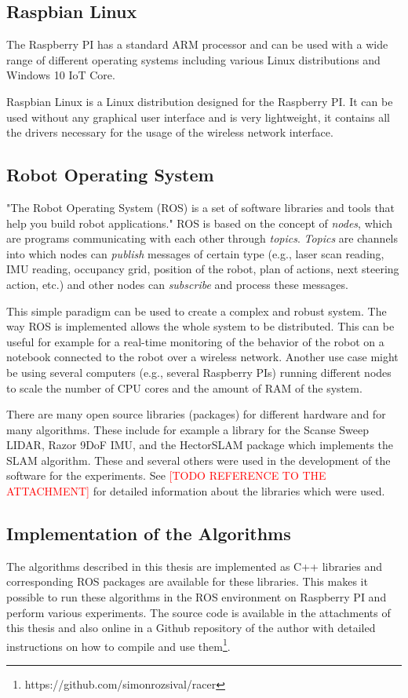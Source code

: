 \subsection{Raspbian Linux}

The Raspberry PI has a standard ARM processor and can be used with a wide range of different operating systems including various Linux distributions and Windows 10 IoT Core.

Raspbian Linux is a Linux distribution designed for the Raspberry PI. It can be used without any graphical user interface and is very lightweight, it contains all the drivers necessary for the usage of the wireless network interface.

\subsection{Robot Operating System}

"The Robot Operating System (ROS) is a set of software libraries and tools that help you build robot applications." \cite{ros} ROS is based on the concept of \textit{nodes}, which are programs communicating with each other through \textit{topics}. \textit{Topics} are channels into which nodes can \textit{publish} messages of certain type (e.g., laser scan reading, IMU reading, occupancy grid, position of the robot, plan of actions, next steering action, etc.) and other nodes can \textit{subscribe} and process these messages.

This simple paradigm can be used to create a complex and robust system. The way ROS is implemented allows the whole system to be distributed. This can be useful for example for a real-time monitoring of the behavior of the robot on a notebook connected to the robot over a wireless network. Another use case might be using several computers (e.g., several Raspberry PIs) running different nodes to scale the number of CPU cores and the amount of RAM of the system.

There are many open source libraries (packages) for different hardware and for many algorithms. These include for example a library for the Scanse Sweep LIDAR, Razor 9DoF IMU, and the HectorSLAM package which implements the SLAM algorithm. These and several others were used in the development of the software for the experiments. See \textcolor{red}{[TODO REFERENCE TO THE ATTACHMENT]} for detailed information about the libraries which were used.

\subsection{Implementation of the Algorithms}

The algorithms described in this thesis are implemented as C++ libraries and corresponding ROS packages are available for these libraries. This makes it possible to run these algorithms in the ROS environment on Raspberry PI and perform various experiments. The source code is available in the attachments of this thesis and also online in a Github repository of the author with detailed instructions on how to compile and use them\footnote{https://github.com/simonrozsival/racer}.